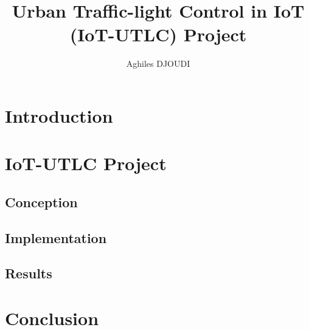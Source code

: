 \documentclass[8pt]{beamer}
\begin{document}
\title{Urban Traffic-light Control in IoT (IoT-UTLC) Project}
\author{Aghiles DJOUDI}

\firstpage

\section{Introduction}
	
\tableofcontent

\section{IoT-UTLC Project}
	\subsection{Conception}
		

	\subsection{Implementation}
		

	\subsection{Results}
		

\section{Conclusion}
	

\alltableofcontent

\frameBibliography
\end{document}
